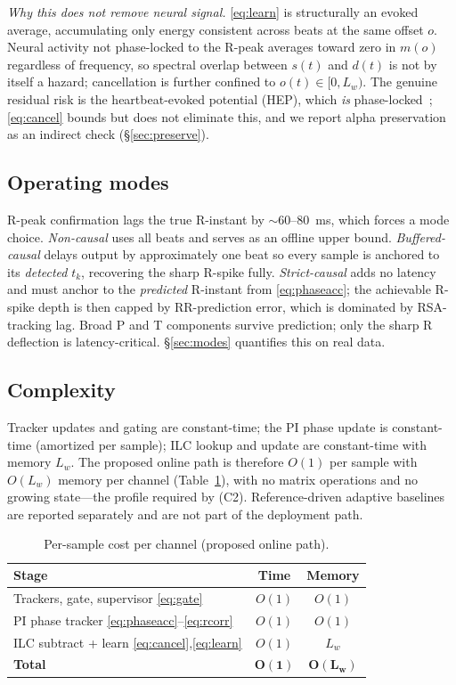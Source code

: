 \documentclass[conference]{IEEEtran}
\begin{document}
\emph{Why this does not remove neural signal.} \eqref{eq:learn} is structurally an evoked average,
accumulating only energy consistent across beats at the same offset $o$. Neural activity not
phase-locked to the R-peak averages toward zero in $m(o)$ regardless of frequency, so spectral
overlap between $s(t)$ and $d(t)$ is not by itself a hazard; cancellation is further confined to
$o(t)\in[0,L_w)$. The genuine residual risk is the heartbeat-evoked potential (HEP), which \emph{is}
phase-locked~\cite{park2019}; \eqref{eq:cancel} bounds but does not eliminate this, and we report
alpha preservation as an indirect check (\S\ref{sec:preserve}).

\subsection{Operating modes}
R-peak confirmation lags the true R-instant by $\sim$60--80~ms, which forces a mode choice.
\emph{Non-causal} uses all beats and serves as an offline upper bound. \emph{Buffered-causal}
delays output by approximately one beat so every sample is anchored to its \emph{detected} $t_k$,
recovering the sharp R-spike fully. \emph{Strict-causal} adds no latency and must anchor to the
\emph{predicted} R-instant from \eqref{eq:phaseacc}; the achievable R-spike depth is then capped by
RR-prediction error, which is dominated by RSA-tracking lag. Broad P and T components survive
prediction; only the sharp R deflection is latency-critical. \S\ref{sec:modes} quantifies this on
real data.

\subsection{Complexity}
Tracker updates and gating are constant-time; the PI phase update is constant-time (amortized
per sample); ILC lookup and update are constant-time with memory $L_w$. The proposed online path is
therefore $O(1)$ per sample with $O(L_w)$ memory per channel (Table~\ref{tab:complexity}), with no
matrix operations and no growing state---the profile required by (C2). Reference-driven adaptive
baselines are reported separately and are not part of the deployment path.

\begin{table}[t]
\centering
\caption{Per-sample cost per channel (proposed online path).}
\label{tab:complexity}
\begin{tabular}{@{}lcc@{}}
\toprule
Stage & Time & Memory \\
\midrule
Trackers, gate, supervisor \eqref{eq:gate}            & $O(1)$ & $O(1)$ \\
PI phase tracker \eqref{eq:phaseacc}--\eqref{eq:rcorr} & $O(1)$ & $O(1)$ \\
ILC subtract + learn \eqref{eq:cancel},\eqref{eq:learn} & $O(1)$ & $L_w$ \\
\midrule
\textbf{Total}                                         & $\mathbf{O(1)}$ & $\mathbf{O(L_w)}$ \\
\bottomrule
\end{tabular}
\end{table}
\end{document}
